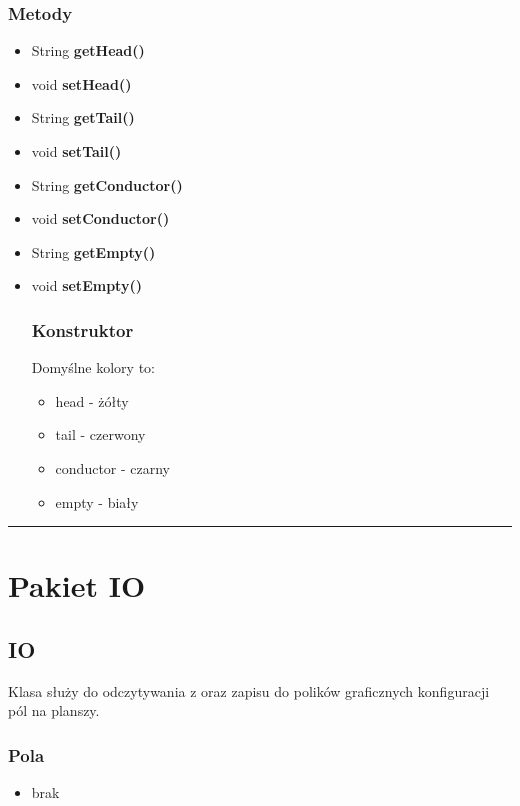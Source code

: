 \documentclass[a4paper,11pt]{article}
\newcommand{\linia}{\rule{\linewidth}{0.4mm}}
\begin{document}
\subsubsection{Metody}
\begin{itemize}
\item String \textbf{getHead()}
\item void \textbf{setHead()}
\item String \textbf{getTail()}
\item void \textbf{setTail()}
\item String \textbf{getConductor()}
\item void \textbf{setConductor()}
\item String \textbf{getEmpty()}
\item void \textbf{setEmpty()}
\subsubsection{Konstruktor}
Domyślne kolory to:
\begin{itemize}
\item head - żółty
\item tail - czerwony
\item conductor - czarny
\item empty - biały
\end{itemize}
\end{itemize}
\noindent\linia







\section{Pakiet IO}

\subsection{IO}

Klasa służy do odczytywania z oraz zapisu do polików graficznych konfiguracji pól na planszy.

\subsubsection{Pola}
\begin{itemize}
\item brak
\end{itemize}
\end{document}
